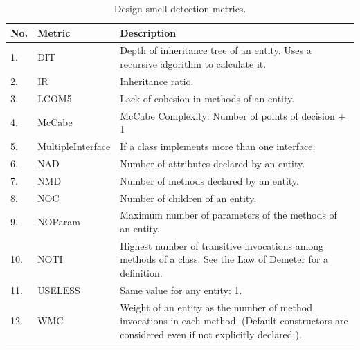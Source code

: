 \documentclass[AMA,Times1COL]{WileyNJDv5} %
\begin{document}
\begin{table}[h]
	\caption{Design smell detection metrics.\label{table:metric}} %
	\centering %
	\begin{tabularx}{\textwidth}{llX}
		\toprule 
		No.& Metric & Description \\ 
		\midrule
		1. & DIT & Depth of inheritance tree of an entity. Uses a recursive algorithm to calculate it. \\ 
		2. & IR & Inheritance ratio.\\ 
		3. & LCOM5 & Lack of cohesion in methods of an entity.\\ 
		4. & McCabe & McCabe Complexity: Number of points of decision + 1 \\ 
		5. & MultipleInterface & If a class implements more than one interface. \\ 
		6. & NAD & Number of attributes declared by an entity. \\ 
		7. & NMD & Number of methods declared by an entity. \\ 
		8. & NOC & Number of children of an entity. \\ 
		9. & NOParam & Maximum number of parameters of the methods of an entity.\\ 
		10. & NOTI & Highest number of transitive invocations among methods of a class. See the Law of Demeter for a definition.\\ 
		11. & USELESS & Same value for any entity: 1.\\ 
		12. & WMC & Weight of an entity as the number of method invocations in each method. (Default constructors are considered even if not explicitly declared.).\\
		\bottomrule
	\end{tabularx}
\end{table}
\end{document}
